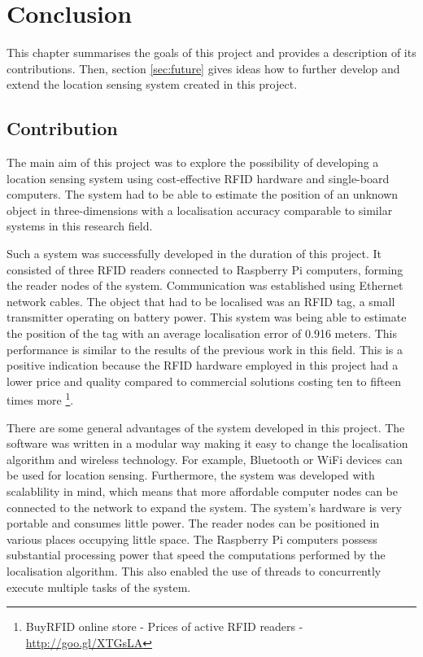 \chapter{Conclusion}
\label{ch:conclusion}

This chapter summarises the goals of this project and provides a description of its contributions. Then, section \ref{sec:future} gives ideas how to further develop and extend the location sensing system created in this project.

\section{Contribution}

The main aim of this project was to explore the possibility of developing a location sensing system using cost-effective RFID hardware and single-board computers. The system had to be able to estimate the position of an unknown object in three-dimensions with a localisation accuracy comparable to similar systems in this research field.

Such a system was successfully developed in the duration of this project. It consisted of three RFID readers connected to  Raspberry Pi computers, forming the reader nodes of the system. Communication was established using Ethernet network cables. The object that had to be localised was an RFID tag, a small transmitter operating on battery power. This system was being able to estimate the position of the tag with an average localisation error of 0.916 meters. This performance is similar to the results of the previous work in this field. This is a positive indication because the RFID hardware employed in this project had a lower price and quality compared to commercial solutions costing ten to fifteen times more \footnote{BuyRFID online store - Prices of active RFID readers - \url{http://goo.gl/XTGsLA}}.

There are some general advantages of the system developed in this project. The software was written in a modular way making it easy to change the localisation algorithm and wireless technology. For example, Bluetooth or WiFi devices can be used for location sensing. Furthermore, the system was developed with scalablility in mind, which means that more affordable computer nodes can be connected to the network to expand the system. The system's hardware is very portable and consumes little power. The reader nodes can be positioned in various places occupying little space. The Raspberry Pi computers possess substantial processing power that speed the computations performed by the localisation algorithm. This also enabled the use of threads to concurrently execute multiple tasks of the system.

